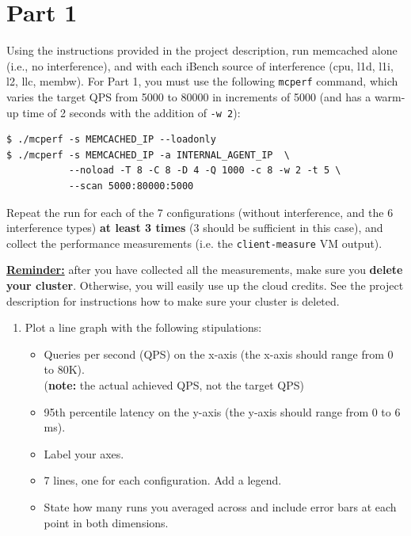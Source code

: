 \section*{Part 1}

Using the instructions provided in the project description, run memcached alone (i.e., no interference), and with each iBench source of interference (cpu, l1d, l1i, l2, llc, membw). For Part 1, you must use the following \texttt{mcperf} command, which varies the target QPS from 5000 to 80000 in increments of 5000 (and has a warm-up time of 2 seconds with the addition of \texttt{-w 2}):

\begin{verbatim}
$ ./mcperf -s MEMCACHED_IP --loadonly
$ ./mcperf -s MEMCACHED_IP -a INTERNAL_AGENT_IP  \
           --noload -T 8 -C 8 -D 4 -Q 1000 -c 8 -w 2 -t 5 \ 
           --scan 5000:80000:5000
\end{verbatim}

\noindent Repeat the run for each of the 7 configurations (without interference, and the 6 interference types) {\color{red} \textbf{at least 3 times}} (3 should be sufficient in this case), and collect the performance measurements (i.e. the \texttt{client-measure} VM output).

\noindent\textbf{\underline{Reminder:}} after you have collected all the measurements, make sure you \textbf{{\color{red}delete your cluster}}. Otherwise, you will easily use up the cloud credits. See the project description for instructions how to make sure your cluster is deleted.


\begin{enumerate}[label=(\alph*)]
    \setcounter{enumi}{0}

    \item Plot a line graph with the following stipulations:
    \begin{itemize}
        \item Queries per second (QPS) on the x-axis (the x-axis should range from 0 to 80K).\\
        (\textbf{note:} the actual achieved QPS, not the target QPS)
        \item 95th percentile latency on the y-axis (the y-axis should range from 0 to 6 ms).
        \item Label your axes.
        \item 7 lines, one for each configuration. Add a legend.
        \item State how many runs you averaged across and include error bars at each point in both dimensions.
    \end{itemize}
    
    
\end{enumerate}

